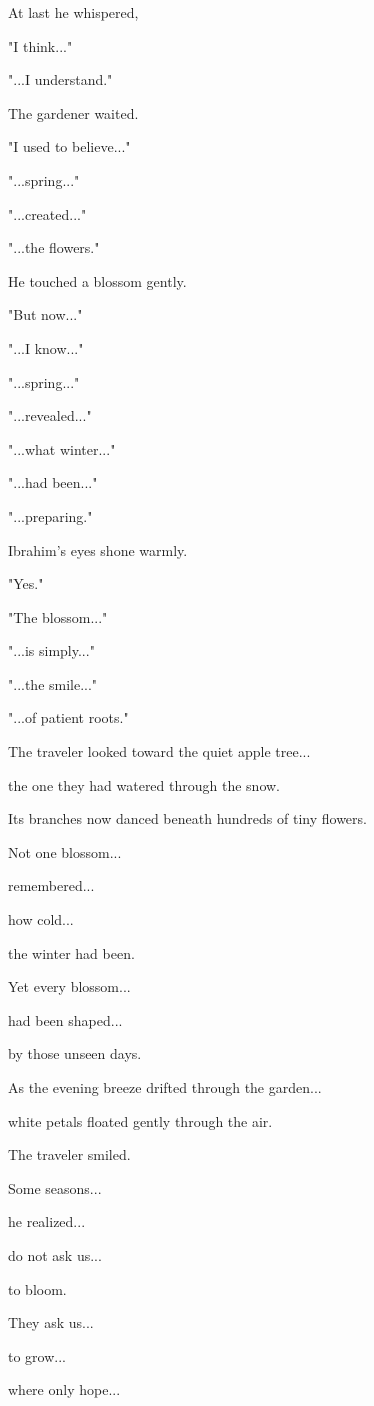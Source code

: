 \documentclass[12pt,openany]{book}
\begin{document}
At last he whispered,

"I think..."

"...I understand."

The gardener waited.

"I used to believe..."

"...spring..."

"...created..."

"...the flowers."

He touched a blossom gently.

"But now..."

"...I know..."

"...spring..."

"...revealed..."

"...what winter..."

"...had been..."

"...preparing."

Ibrahim's eyes shone warmly.

"Yes."

"The blossom..."

"...is simply..."

"...the smile..."

"...of patient roots."

The traveler looked toward the quiet apple tree...

the one they had watered through the snow.

Its branches now danced beneath hundreds of tiny flowers.

Not one blossom...

remembered...

how cold...

the winter had been.

Yet every blossom...

had been shaped...

by those unseen days.

As the evening breeze drifted through the garden...

white petals floated gently through the air.

The traveler smiled.

Some seasons...

he realized...

do not ask us...

to bloom.

They ask us...

to grow...

where only hope...
\end{document}
